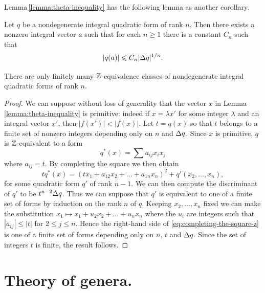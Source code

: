 Lemma\,\ref{lemma:theta-inequality} has the following lemma as another
corollary.

\begin{lemmax}
    {\normalfont \cite[p.\,135]{cassels2008rational}} Let \(q\) be a
    nondegenerate integral quadratic form of rank \(n\). Then there exists a
    nonzero integral vector \(a\) such that for each \(n \geq 1\) there is a
    constant \(C_n\) such that
    \[
        |q(a)| \leqslant C_n |{\Delta} q|^{1/n}.
    \]
\end{lemmax}

\begin{theorem}
    {\normalfont \cite[p.\,129]{cassels2008rational}} There are only finitely
    many \(\mathbb{Z}\)-equivalence classes of nondegenerate integral quadratic
    forms of rank \(n\).
\end{theorem}

\begin{proof}
    We can suppose without loss of generality that the vector \(x\) in
    Lemma\,\ref{lemma:theta-inequality} is primitive: indeed if \(x = \lambda
    x'\) for some integer \(\lambda\) and an integral vector \(x'\), then
    \(|f(x')| < |f(x)|\). Let \(t = q(x)\) so that \(t\) belongs to a finite set
    of nonzero integers depending only on \(n\) and \({\Delta} q\). Since \(x\) is
    primitive, \(q\) is \(\mathbb{Z}\)-equivalent to a form
    \[
        q^*(x) = \sum a_{ij}x_i x_j
    \]
    where \(a_{ij} = t\). By completing the square we then obtain
    \begin{equation}\label{eq:completing-the-square-z}
        tq^*(x) = (tx_1 + a_{12}x_2 + \dots + a_{1n}x_n)^2 + q'(x_2, \dots, x_n),
    \end{equation}
    for some quadratic form \(q'\) of rank \(n-1\). We can then compute the
    discriminant of \(q'\) to be \(t^{n-2} {\Delta} q\). Thus we can suppose that
    \(q'\) is equivalent to one of a finite set of forms by induction on the
    rank \(n\) of \(q\). Keeping \(x_2, \dots, x_n\) fixed we can make the
    substitution \(x_1 \mapsto x_1 + u_2 x_2 + \dots + u_n x_n\) where the
    \(u_i\) are integers such that \(|a_{ij}| \leq |t|\) for \(2 \leq j \leq
    n\). Hence the right-hand side of \eqref{eq:completing-the-square-z} is one
    of a finite set of forms depending only on \(n\), \(t\) and \({\Delta} q\).
    Since the set of integers \(t\) is finite, the result follows.
\end{proof}


\section{Theory of genera.}

